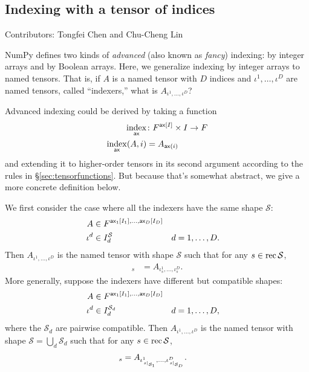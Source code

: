 \subsection{Indexing with a tensor of indices}

Contributors: Tongfei Chen and Chu-Cheng Lin

NumPy defines two kinds of \emph{advanced} (also known as \emph{fancy}) indexing: by integer arrays and by Boolean arrays. Here, we generalize indexing by integer arrays to named tensors. That is, if $A$ is a named tensor with $D$ indices and $\iota^1, \ldots, \iota^D$ are named tensors, called ``indexers,'' what is $A_{\iota^1, \ldots, \iota^D}$?

Advanced indexing could be derived by taking a function
\begin{align*}
  \nfun{ax}{index} &\colon F^{\nset{ax}{I}} \times I \rightarrow F \\
  \nfun{ax}{index}(A, i) &= A_{\nidx{ax}{i}}
\end{align*}
and extending it to higher-order tensors in its second argument according to the rules in \S\ref{sec:tensorfunctions}. But because that's somewhat abstract, we give a more concrete definition below.

We first consider the case where all the indexers have the same shape $\mathcal{S}$:
\begin{align*}
  A &\in F^{\nset{ax\sub{1}}{I_1}, \ldots, \nset{ax\sub{D}}{I_D}} \\
  \iota^d &\in I_d^{\mathcal{S}} & d &= 1, \ldots, D.
\end{align*}
Then $A_{\iota^1, \ldots, \iota^D}$ is the named tensor with shape $\mathcal{S}$ such that for any $s \in \rec{\mathcal{S}}$,
\begin{align*}
  [A_{\iota^1, \ldots, \iota^D}]_s &= A_{\iota^1_s, \ldots, \iota^D_s}.
\end{align*}
More generally, suppose the indexers have different but compatible shapes:
\begin{align*}
  A &\in F^{\nset{ax\sub{1}}{I_1}, \ldots, \nset{ax\sub{D}}{I_D}} \\
  \iota^d &\in I_d^{\mathcal{S}_d} & d &= 1, \ldots, D,
\end{align*}
where the $\mathcal{S}_d$ are pairwise compatible. Then $A_{\iota^1, \ldots, \iota^D}$ is the named tensor with shape $\mathcal{S} = \bigcup_d \mathcal{S}_d$ such that for any $s \in \rec{\mathcal{S}}$,
\begin{align*}
  [A_{\iota^1, \ldots, \iota^D}]_s &= A_{\iota^1_{\restrict{s}{\mathcal{S}_1}}, \ldots, \iota^D_{\restrict{s}{\mathcal{S}_D}}}.
\end{align*}

